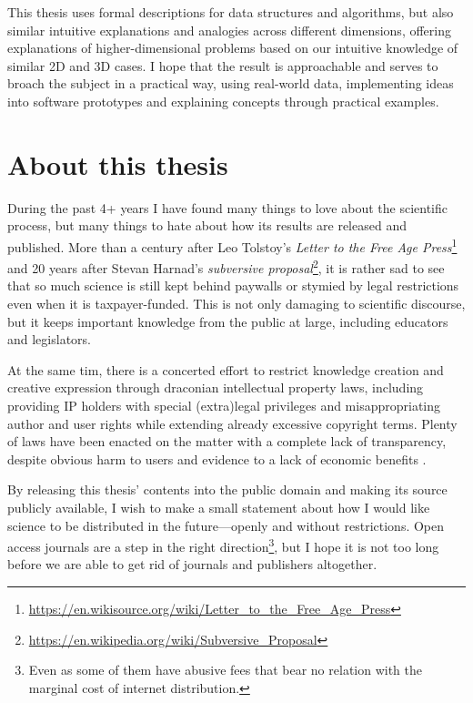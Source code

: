 This thesis uses formal descriptions for data structures and algorithms, but also similar intuitive explanations and analogies across different dimensions, offering explanations of higher-dimensional problems based on our intuitive knowledge of similar 2D and 3D cases.
I hope that the result is approachable and serves to broach the subject in a practical way, using real-world data, implementing ideas into software prototypes and explaining concepts through practical examples.

\section*{About this thesis}

During the past 4+ years I have found many things to love about the scientific process, but many things to hate about how its results are released and published.
More than a century after Leo Tolstoy's \emph{Letter to the Free Age Press}\footnote{\url{https://en.wikisource.org/wiki/Letter_to_the_Free_Age_Press}} and 20 years after Stevan Harnad's \emph{subversive proposal}\footnote{\url{https://en.wikipedia.org/wiki/Subversive_Proposal}}, it is rather sad to see that so much science is still kept behind paywalls or stymied by legal restrictions even when it is taxpayer-funded.
This is not only damaging to scientific discourse, but it keeps important knowledge from the public at large, including educators and legislators.

At the same tim, there is a concerted effort to restrict knowledge creation and creative expression through draconian intellectual property laws, including providing IP holders with special (extra)legal privileges and misappropriating author and user rights while extending already excessive copyright terms.
Plenty of laws have been enacted on the matter with a complete lack of transparency, despite obvious harm to users and evidence to a lack of economic benefits \citep{Hargreaves11,Reda14,EFI15}.

By releasing this thesis' contents into the public domain and making its source publicly available, I wish to make a small statement about how I would like science to be distributed in the future---openly and without restrictions.
Open access journals are a step in the right direction\footnote{Even as some of them have abusive fees that bear no relation with the marginal cost of internet distribution.}, but I hope it is not too long before we are able to get rid of journals and publishers altogether.

